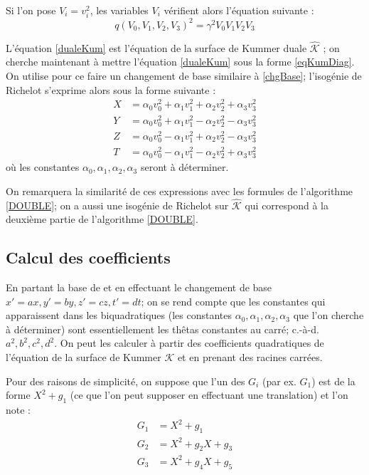 \documentclass[a4paper]{article}
\theoremstyle{definition}
\theoremstyle{remark}
\numberwithin{equation}{section}
\begin{document}
Si l'on pose $V_i = v_i^2$, les variables $V_i$ vérifient alors l'équation suivante :
\begin{equation}
\label{dualeKum}
q(V_0,V_1,V_2,V_3)^2 = \gamma^2 V_0V_1V_2V_3
\end{equation}

L'équation \ref{dualeKum} est l'équation de la surface de Kummer duale $\hat{\mathcal{K}}$ \citep{cassels-Flynn}; on cherche maintenant à mettre l'équation \ref{dualeKum} sous la forme \ref{eqKumDiag}. On utilise pour ce faire un changement de base similaire à \ref{chgBase}; l'isogénie de Richelot s'exprime alors sous la forme suivante :
\begin{align*}
X &= \alpha_0v_0^2+\alpha_1v_1^2+\alpha_2v_2^2+\alpha_3v_3^2 \\
Y &= \alpha_0v_0^2+\alpha_1v_1^2-\alpha_2v_2^2-\alpha_3v_3^2 \\
Z &= \alpha_0v_0^2-\alpha_1v_1^2+\alpha_2v_2^2-\alpha_3v_3^2 \\
T &= \alpha_0v_0^2-\alpha_1v_1^2-\alpha_2v_2^2+\alpha_3v_3^2
\end{align*}
où les constantes $\alpha_0,\alpha_1,\alpha_2,\alpha_3$ seront à déterminer.

On remarquera la similarité de ces expressions avec les formules de l'algorithme \ref{DOUBLE}; on a aussi une isogénie de Richelot sur $\hat{\mathcal{K}}$ qui correspond à la deuxième partie de l'algorithme \ref{DOUBLE}.

\subsection{Calcul des coefficients}

En partant la base de \citet{gaudry} et en effectuant le changement de base $x'=ax,y'=by,z'=cz,t'=dt$; on se rend compte que les constantes qui apparaissent dans les biquadratiques (les constantes $\alpha_0,\alpha_1,\alpha_2,\alpha_3$ que l'on cherche à déterminer) sont essentiellement les thêtas constantes au carré; c.-à-d. $a^2,b^2,c^2,d^2$. On peut les calculer à partir des coefficients quadratiques de l'équation de la surface de Kummer $\mathcal{K}$ et en prenant des racines carrées.

Pour des raisons de simplicité, on suppose que l'un des $G_i$ (par ex. $G_1$) est de la forme $X^2 + g_1$ (ce que l'on peut supposer en effectuant une translation) et l'on note :
\begin{align*}
G_1 &= X^2 + g_1 \\
G_2 &= X^2+g_2X+g_3 \\
G_3 &= X^2+g_4X+g_5
\end{align*}
\end{document}
